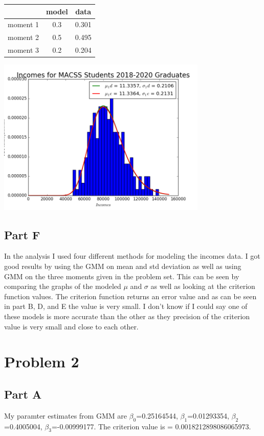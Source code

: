 \documentclass{article}
\begin{document}
\begin{center}
  \begin{tabular}{ l | c | c }
    \hline
     & model & data \\ \hline
    moment 1 & 0.3 & 0.301 \\ \hline
    moment 2 & 0.5 & 0.495 \\ \hline
    moment 3 & 0.2 & 0.204 \\
    \hline
  \end{tabular}
\end{center}
\begin{center}\includegraphics[width=100mm]{images/1e.png}\end{center}

\subsection*{Part F}
In the analysis I used four different methods for modeling the incomes data.  I got good results by using the GMM on mean and std deviation as well as using GMM on the three moments given in the problem set.  This can be seen by comparing the graphs of the modeled $\mu$ and $\sigma$ as well as looking at the criterion function values.  The criterion function returns an error value and as can be seen in part B, D, and E the value is very small.  I don't know if I could say one of these models is more accurate than the other as they precision of the criterion value is very small and close to each other.
\section*{Problem 2}

\subsection*{Part A}
My paramter estimates from GMM are $\beta_0$=0.25164544, $\beta_1$=0.01293354, $\beta_2$=0.4005004, $\beta_3$=-0.00999177.  The criterion value is = 0.0018212898086065973.
\end{document}

